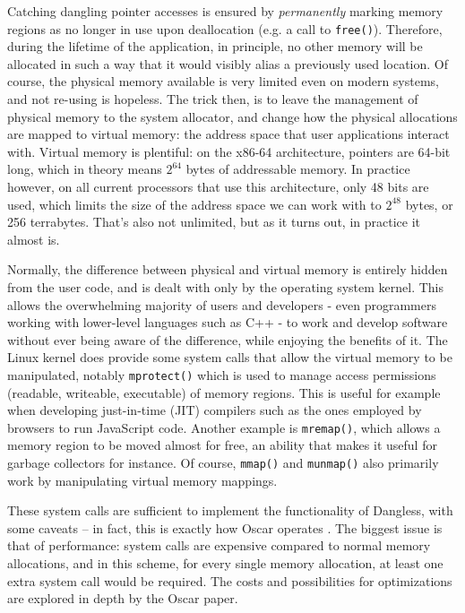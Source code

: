 Catching dangling pointer accesses is ensured by \emph{permanently} marking memory regions as no longer in use upon deallocation (e.g. a call to \lstinline!free()!). Therefore, during the lifetime of the application, in principle, no other memory will be allocated in such a way that it would visibly alias a previously used location. Of course, the physical memory available is very limited even on modern systems, and not re-using is hopeless. The trick then, is to leave the management of physical memory to the system allocator, and change how the physical allocations are mapped to virtual memory: the address space that user applications interact with. Virtual memory is plentiful: on the x86-64 architecture, pointers are 64-bit long, which in theory means $2^{64}$ bytes of addressable memory. In practice however, on all current processors that use this architecture, only 48 bits are used, which limits the size of the address space we can work with to $2^{48}$ bytes, or 256 terrabytes. That's also not unlimited, but as it turns out, in practice it almost is.

Normally, the difference between physical and virtual memory is entirely hidden from the user code, and is dealt with only by the operating system kernel. This allows the overwhelming majority of users and developers - even programmers working with lower-level languages such as C++ - to work and develop software without ever being aware of the difference, while enjoying the benefits of it. The Linux kernel does provide some system calls that allow the virtual memory to be manipulated, notably \lstinline!mprotect()! which is used to manage access permissions (readable, writeable, executable) of memory regions. This is useful for example when developing just-in-time (JIT) compilers such as the ones employed by browsers to run JavaScript code. Another example is \lstinline!mremap()!, which allows a memory region to be moved almost for free, an ability that makes it useful for garbage collectors for instance. Of course,  \lstinline!mmap()! and \lstinline!munmap()! also primarily work by manipulating virtual memory mappings.

These system calls are sufficient to implement the functionality of Dangless, with some caveats -- in fact, this is exactly how Oscar operates . The biggest issue is that of performance: system calls are expensive compared to normal memory allocations, and in this scheme, for every single memory allocation, at least one extra system call would be required. The costs and possibilities for optimizations are explored in depth by the Oscar paper.

